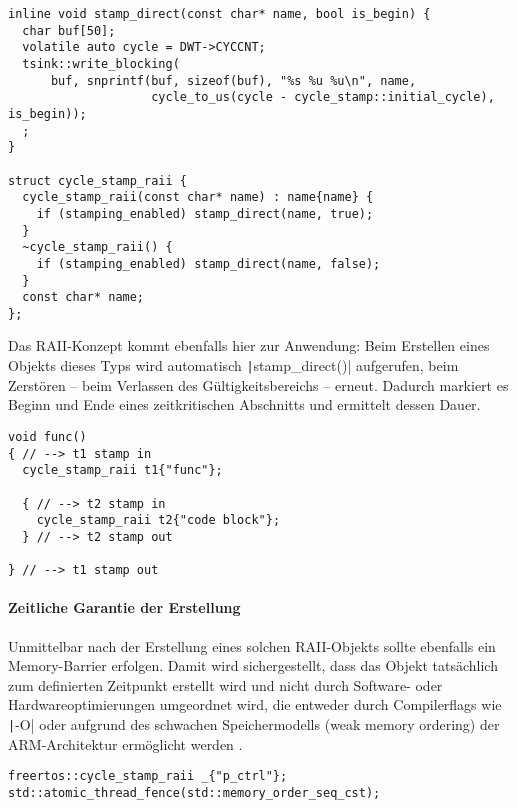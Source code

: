 \begin{code}
\begin{verbatim}
inline void stamp_direct(const char* name, bool is_begin) {
  char buf[50];
  volatile auto cycle = DWT->CYCCNT;
  tsink::write_blocking(
      buf, snprintf(buf, sizeof(buf), "%s %u %u\n", name,
                    cycle_to_us(cycle - cycle_stamp::initial_cycle), is_begin));
  ;
}

struct cycle_stamp_raii {
  cycle_stamp_raii(const char* name) : name{name} {
    if (stamping_enabled) stamp_direct(name, true);
  }
  ~cycle_stamp_raii() {
    if (stamping_enabled) stamp_direct(name, false);
  }
  const char* name;
};
\end{verbatim}
\end{code}

Das RAII-Konzept kommt ebenfalls hier zur Anwendung: Beim Erstellen eines
Objekts dieses Typs wird automatisch \texttt|stamp_direct()|
aufgerufen, beim Zerstören -- beim Verlassen des Gültigkeitsbereichs -- erneut.
Dadurch markiert es Beginn und Ende eines zeitkritischen Abschnitts und
ermittelt dessen Dauer.

\begin{code}
\begin{verbatim}
void func()
{ // --> t1 stamp in
  cycle_stamp_raii t1{"func"};

  { // --> t2 stamp in
    cycle_stamp_raii t2{"code block"};
  } // --> t2 stamp out

} // --> t1 stamp out
\end{verbatim}
\end{code}

\paragraph{Zeitliche Garantie der Erstellung}

Unmittelbar nach der Erstellung eines solchen RAII-Objekts sollte ebenfalls ein
Memory-Barrier erfolgen. Damit wird sichergestellt, dass das Objekt tatsächlich
zum definierten Zeitpunkt erstellt wird und nicht durch Software- oder
Hardwareoptimierungen umgeordnet wird, die entweder durch Compilerflags wie
\texttt|-O| oder aufgrund des schwachen Speichermodells (weak memory
ordering) der ARM-Architektur ermöglicht werden \cite[S. 5]{arm_sync_overview}.

\begin{code}
\begin{verbatim}
freertos::cycle_stamp_raii _{"p_ctrl"};
std::atomic_thread_fence(std::memory_order_seq_cst);
\end{verbatim}
\end{code}

